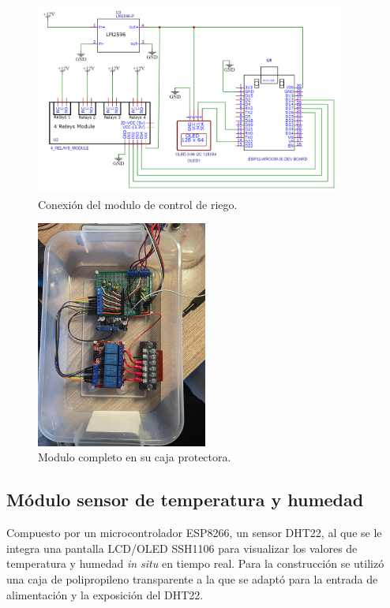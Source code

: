 \begin{figure}[!h]
	\centering
	\includegraphics[width=0.9\textwidth]{./Figures/pump_schem.png}
	\caption[Conexión del modulo de control de riego]{Conexión del modulo de control de riego.}
	\label{fig:riegochem}
\end{figure}

\begin{figure}[!h]
	\centering
	\includegraphics[width=0.5\textwidth]{./Figures/riego1.jpg}
	\caption[Modulo completo en su caja protectora]{Modulo completo en su caja protectora.}
	\label{fig:riego_control}
\end{figure}
 
\pagebreak

\subsection{Módulo sensor de temperatura y humedad}
\label{Módulo sensor de temperatura y humedad}

Compuesto por un microcontrolador ESP8266, un sensor DHT22, al que se le integra una pantalla LCD/OLED SSH1106 para visualizar los valores de temperatura y humedad  \textit{in situ} en tiempo real. 
Para la construcción se utilizó una caja de polipropileno transparente a la que se adaptó para la entrada de alimentación y la exposición del DHT22. 


